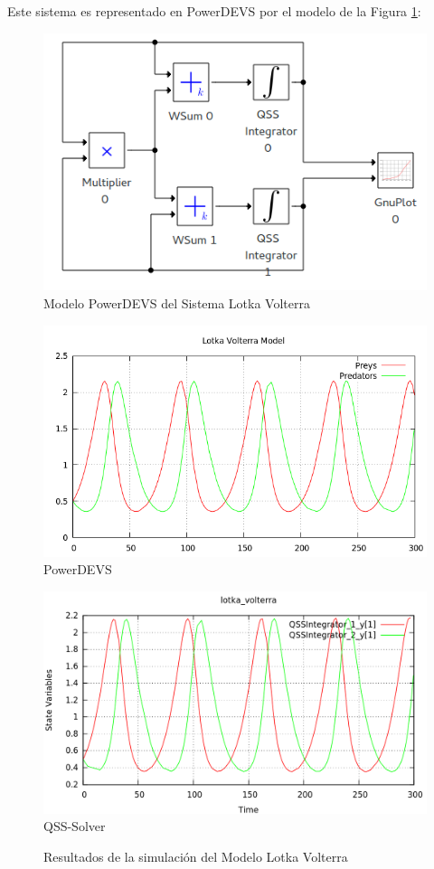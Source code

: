 	Este sistema es representado en PowerDEVS por el modelo de la Figura \ref{model:lotka_volterra}:

\begin{figure}[H]
\includegraphics[width=0.75\linewidth]{lotka_voltera_pwd}
\caption{Modelo PowerDEVS del Sistema Lotka Volterra}
\label{model:lotka_volterra}
\end{figure}

\begin{figure}[H]
\centering
\begin{minipage}{0.5\textwidth}
\centering
 \includegraphics[width=\linewidth]{lotka_voltera-pd}
PowerDEVS \\
\end{minipage}\hfill
\begin{minipage}{0.5\textwidth}
\centering
 \includegraphics[width=\linewidth]{lotka_voltera-qss}
QSS-Solver \\
\end{minipage}
\label{graph:lotka_voltera}
\caption{Resultados de la simulación del Modelo Lotka Volterra}
\end{figure}

